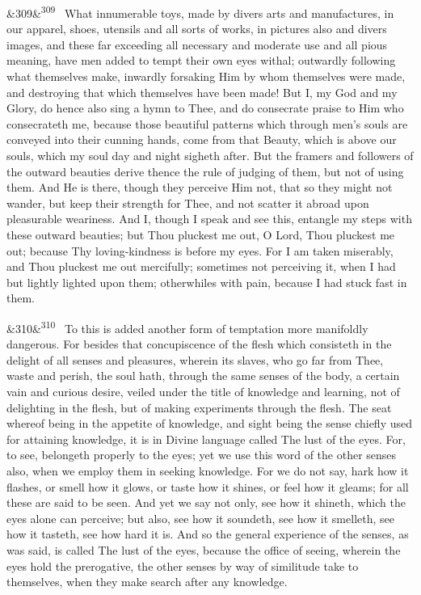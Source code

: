 \documentclass[12pt]{article}
\newcommand{\para}[1][]{\par\noindent\ifx&#1&\else\textsuperscript{\footnotesize #1}~\fi}
\begin{document}
\para[309] What innumerable toys, made by divers arts and manufactures, in our apparel, shoes, utensils and all sorts of works, in pictures also and divers images, and these far exceeding all necessary and moderate use and all pious meaning, have men added to tempt their own eyes withal; outwardly following what themselves make, inwardly forsaking Him by whom themselves were made, and destroying that which themselves have been made! But I, my God and my Glory, do hence also sing a hymn to Thee, and do consecrate praise to Him who consecrateth me, because those beautiful patterns which through men's souls are conveyed into their cunning hands, come from that Beauty, which is above our souls, which my soul day and night sigheth after. But the framers and followers of the outward beauties derive thence the rule of judging of them, but not of using them. And He is there, though they perceive Him not, that so they might not wander, but keep their strength for Thee, and not scatter it abroad upon pleasurable weariness. And I, though I speak and see this, entangle my steps with these outward beauties; but Thou pluckest me out, O Lord, Thou pluckest me out; because Thy loving-kindness is before my eyes. For I am taken miserably, and Thou pluckest me out mercifully; sometimes not perceiving it, when I had but lightly lighted upon them; otherwhiles with pain, because I had stuck fast in them.

\para[310] To this is added another form of temptation more manifoldly dangerous. For besides that concupiscence of the flesh which consisteth in the delight of all senses and pleasures, wherein its slaves, who go far from Thee, waste and perish, the soul hath, through the same senses of the body, a certain vain and curious desire, veiled under the title of knowledge and learning, not of delighting in the flesh, but of making experiments through the flesh. The seat whereof being in the appetite of knowledge, and sight being the sense chiefly used for attaining knowledge, it is in Divine language called The lust of the eyes. For, to see, belongeth properly to the eyes; yet we use this word of the other senses also, when we employ them in seeking knowledge. For we do not say, hark how it flashes, or smell how it glows, or taste how it shines, or feel how it gleams; for all these are said to be seen. And yet we say not only, see how it shineth, which the eyes alone can perceive; but also, see how it soundeth, see how it smelleth, see how it tasteth, see how hard it is. And so the general experience of the senses, as was said, is called The lust of the eyes, because the office of seeing, wherein the eyes hold the prerogative, the other senses by way of similitude take to themselves, when they make search after any knowledge.
\end{document}
